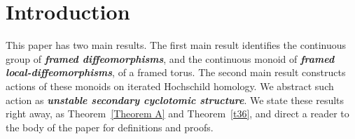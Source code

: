 \documentclass{amsart}
\theoremstyle{definition}
\theoremstyle{remark}
\newcommand{\bit}[1]{\textbf{\textit{#1}}}
\begin{document}
\section*{Introduction}




This paper has two main results.
The first main result identifies the continuous group of \bit{framed diffeomorphisms}, and the continuous monoid of \bit{framed local-diffeomorphisms}, of a framed torus.
The second main result constructs actions of these monoids on iterated Hochschild homology.
We abstract such action as \bit{unstable secondary cyclotomic structure}.  
We state these results right away, as Theorem~\ref{Theorem A} and Theorem~\ref{t36}, and direct a reader to the body of the paper for definitions and proofs.  
\end{document}
